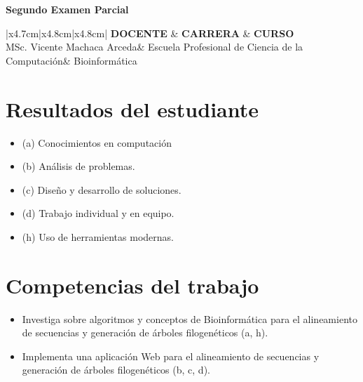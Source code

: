 \documentclass{article}
\newcommand{\csdocente}{MSc. Vicente Machaca Arceda}
\newcommand{\cscurso}{Bioinformática}
\newcommand{\csescuela}{Escuela Profesional de Ciencia de la Computación}
\begin{document}
		
	
	\begin{center}	
		\fontsize{15}{15} \textbf{Segundo Examen Parcial} %
	\end{center}

\begin{table}[h]
	\begin{tabular}{|x{4.7cm}|x{4.8cm}|x{4.8cm}|}
		\hline 
		\textbf{DOCENTE} & \textbf{CARRERA}  & \textbf{CURSO}   \\
		\hline 
		\csdocente & \csescuela & \cscurso    \\
		\hline 
	\end{tabular}
\end{table}
	

\section{Resultados del estudiante}
\begin{itemize}
	\item (a) Conocimientos en computación
	\item (b) Análisis de problemas.
	\item (c) Diseño y desarrollo de soluciones.
	\item (d) Trabajo individual y en equipo.
	\item (h) Uso de herramientas modernas.
\end{itemize}


\section{Competencias del trabajo}
\begin{itemize}
	\item Investiga sobre algoritmos y conceptos de Bioinformática para el alineamiento de secuencias y generación de árboles filogenéticos (a, h).
	\item Implementa una aplicación Web para el alineamiento de secuencias y generación de árboles filogenéticos (b, c, d).
\end{itemize}
\end{document}
